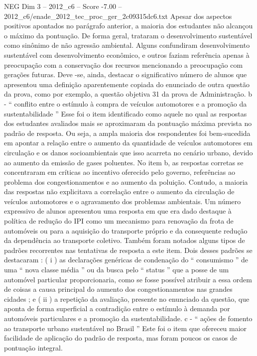 \begin{textsample}{NEG Dim 3 – 2012\_c6 – Score -7.00 – 2012\_c6/enade\_2012\_tec\_proc\_ger\_2c09315dc6.txt}
Apesar dos aspectos positivos apontados no parágrafo anterior, a maioria dos estudantes não alcançou o máximo da pontuação.
De forma geral, trataram o desenvolvimento sustentável como sinônimo de não agressão ambiental.
Alguns confundiram desenvolvimento sustentável com desenvolvimento econômico, e outros faziam referência apenas à preocupação com a conservação dos recursos mencionando a preocupação com gerações futuras.
Deve -se, ainda, destacar o significativo número de alunos que apresentou uma definição aparentemente copiada do enunciado de outra questão da prova, como por exemplo, a questão objetiva 31 da prova de Administração. b - “ conflito entre o estímulo à compra de veículos automotores e a promoção da sustentabilidade ” Esse foi o item identificado como aquele no qual as respostas dos estudantes avaliados mais se aproximaram da pontuação máxima prevista no padrão de resposta.
Ou seja, a ampla maioria dos respondentes foi bem-sucedida em apontar a relação entre o aumento da quantidade de veículos automotores em circulação e os danos socioambientais que isso acarreta no cenário urbano, devido ao aumento da emissão de gases poluentes.
No item b, as respostas corretas se concentraram em críticas ao incentivo oferecido pelo governo, referências ao problema dos congestionamentos e ao aumento da poluição.
Contudo, a maioria das respostas não explicitava a correlação entre o aumento da circulação de veículos automotores e o agravamento dos problemas ambientais.
Um número expressivo de alunos apresentou uma resposta em que era dado destaque à política de redução do IPI como um mecanismo para renovação da frota de automóveis ou para a aquisição do transporte próprio e da consequente redução da dependência ao transporte coletivo.
Também foram notados alguns tipos de padrões recorrentes nas tentativas de resposta a este item.
Dois desses padrões se destacaram : ( i ) as declarações genéricas de condenação do “ consumismo ” de uma “ nova classe média ” ou da busca pelo “ status ” que a posse de um automóvel particular proporcionaria, como se fosse possível atribuir a essa ordem de coisas a causa principal do aumento dos congestionamentos nas grandes cidades ; e ( ii ) a repetição da avaliação, presente no enunciado da questão, que aponta de forma superficial a contradição entre o estímulo à demanda por automóveis particulares e a promoção da sustentabilidade. c - “ ações de fomento ao transporte urbano sustentável no Brasil ” Este foi o item que ofereceu maior facilidade de aplicação do padrão de resposta, mas foram poucos os casos de pontuação integral.

\end{textsample}
